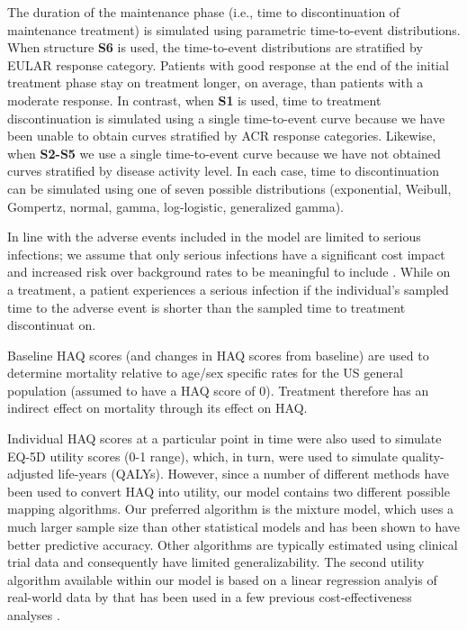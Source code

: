\documentclass[11pt,final,fleqn]{article}\usepackage[]{graphicx}\usepackage[]{color}
\theoremstyle{plain}
\begin{document}
The duration of the maintenance phase (i.e., time to discontinuation of maintenance treatment) is simulated using parametric time-to-event distributions. When structure \textbf{S6} is used, the time-to-event distributions are stratified by EULAR response category. Patients with good response at the end of the initial treatment phase stay on treatment longer, on average, than patients with a moderate response. In contrast, when \textbf{S1} is used, time to treatment discontinuation is simulated using a single time-to-event curve because we have been unable to obtain curves stratified by ACR response categories. Likewise, when \textbf{S2-S5} we use a single time-to-event curve because we have not obtained curves stratified by disease activity level. In each case, time to discontinuation can be simulated using one of seven possible distributions (exponential, Weibull, Gompertz, normal, gamma, log-logistic, generalized gamma).

In line with \citet{stevenson2016adalimumab} the adverse events included in the model are limited to serious infections; we assume that only serious infections have a significant cost impact and increased risk over background rates to be meaningful to include \citep{ramiro2017safety}. While on a treatment, a patient experiences a serious infection if the individual's sampled time to the adverse event is shorter than the sampled time to treatment discontinuat on.

Baseline HAQ scores (and changes in HAQ scores from baseline) are used to determine mortality relative to age/sex specific rates for the US general population (assumed to have a HAQ score of 0). Treatment therefore has an indirect effect on mortality through its effect on HAQ. 

Individual HAQ scores at a particular point in time were also used to simulate EQ-5D utility scores (0-1 range), which, in turn, were used to simulate quality-adjusted life-years (QALYs). However, since a number of different methods have been used to convert HAQ into utility, our model contains two different possible mapping algorithms. Our preferred algorithm is the \citet{alava2013relationship} mixture model, which uses a much larger sample size than other statistical models and has been shown to have better predictive accuracy. Other algorithms are typically estimated using clinical trial data \citep[e.g.][]{carlson2015economic, stephens2015modelling} and consequently have limited generalizability. The second utility algorithm available within our model is based on a linear regression analyis of real-world data by \citet{wailoo2006modeling} that has been used in a few previous cost-effectiveness analyses \citep[e.g.][]{wailoo2008biologic, icer2017tim}. 
\end{document}

